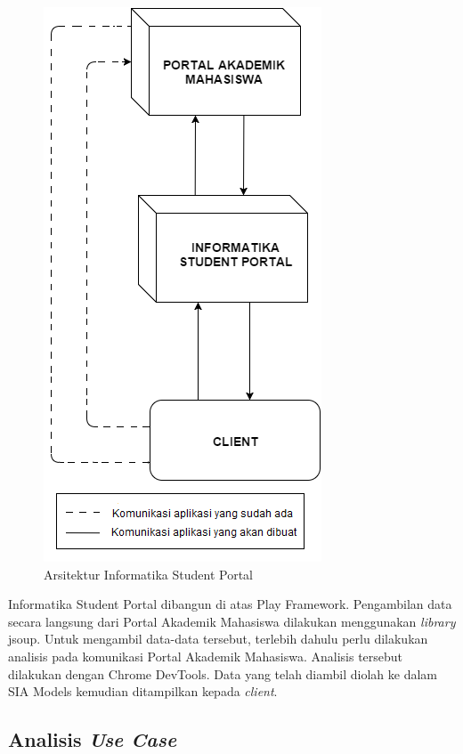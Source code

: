 		\begin{figure}[H]
			\centering
			\includegraphics[scale=0.5]{Gambar/arsitekturIFPortal}
			\caption{Arsitektur Informatika Student Portal} 
			\label{fig:3_ars_portal}
		\end{figure}
		
Informatika Student Portal dibangun di atas Play Framework. Pengambilan data secara langsung dari Portal Akademik Mahasiswa dilakukan menggunakan \textit{library} jsoup. Untuk mengambil data-data tersebut, terlebih dahulu perlu dilakukan analisis pada komunikasi Portal Akademik Mahasiswa. Analisis tersebut dilakukan dengan Chrome DevTools. Data yang telah diambil diolah ke dalam SIA Models kemudian ditampilkan kepada \textit{client}.
		
\subsection{Analisis \textit{Use Case}}
